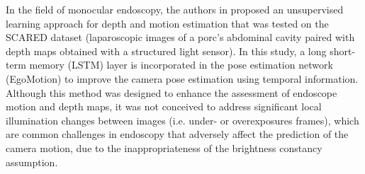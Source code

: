 \documentclass[a4paper,fleqn]{cas-dc}
\begin{document}
In the field of monocular endoscopy, the authors in \citep{Li_IEEETII_2021} proposed an unsupervised learning approach for depth and motion estimation that was tested on the SCARED \citep{Allan_SCARED_2021} dataset (laparoscopic images of a porc's abdominal cavity paired with depth maps obtained with a structured light sensor). In this study, a long short-term memory (LSTM) layer is incorporated in the pose estimation network (EgoMotion) to improve the camera pose estimation using temporal information. Although this method was designed to enhance the assessment of endoscope motion and depth maps, it was not conceived to address significant local illumination changes between images (i.e. under- or overexposures frames), which are common challenges in endoscopy that adversely affect the prediction of the camera motion, due to the inappropriateness of the brightness constancy assumption.
\end{document}
